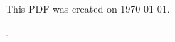 \documentclass{article}
\begin{document}
	This PDF was created on \today.
	
	\DTMnow.
\end{document}
